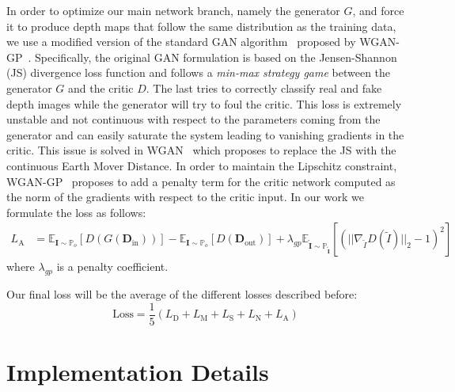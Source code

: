 \vspace{1mm}
 In order to optimize our main network branch, namely the generator $G$, and force it to produce depth maps that follow the same distribution as the training data, we use a modified version of the standard GAN algorithm~\cite{NIPS2014_5ca3e9b1} proposed by WGAN-GP~\cite{NIPS2017_892c3b1c}. Specifically, the original GAN formulation is based on the Jensen-Shannon (JS) divergence loss function and follows a \textit{min-max strategy game} between the generator $G$ and the critic $D$. The last tries to correctly classify real and fake depth images while the generator will try to foul the critic. This loss is extremely unstable and not continuous with respect to the parameters coming from the generator and can easily saturate the system leading to vanishing gradients in the critic. This issue is solved in WGAN~\cite{arjovsky2017wasserstein} which proposes to replace the JS with the continuous Earth Mover Distance. In order to maintain the Lipschitz constraint, WGAN-GP~\cite{NIPS2017_892c3b1c} proposes to add a penalty term for the critic network computed as the norm of the gradients with respect to the critic input. In our work we formulate the loss as follows:
\begin{align}
    L_\textrm{A} & = \mathbb{E}_{\textbf{I} \sim \mathbb{P}_o}[D(G(\mathbf{D}_{\textrm{in}}))] - \mathbb{E}_{\textbf{I} \sim \mathbb{P}_o}[D(\mathbf{D}_{\textrm{out}})] + \lambda_{gp} \mathbb{E}_{\tilde{\mathbf{I}} \sim \mathbb{P}_{\tilde{\mathbf{I}}}}[(|| \nabla_{\tilde{I}} D(\tilde{I}) ||_2 - 1) ^ 2]
\end{align}
where $\lambda_{gp}$ is a penalty coefficient.

\vspace{1mm}
 Our final loss will be the average of the different losses described before:
\begin{equation}
     \text{Loss} =\frac{1}{5}(L_{\textrm{D}} + L_{\textrm{M}} + L_{\textrm{S}} + L_{\textrm{N}} + L_{\textrm{A}}) 
\end{equation}

\section{Implementation Details}

